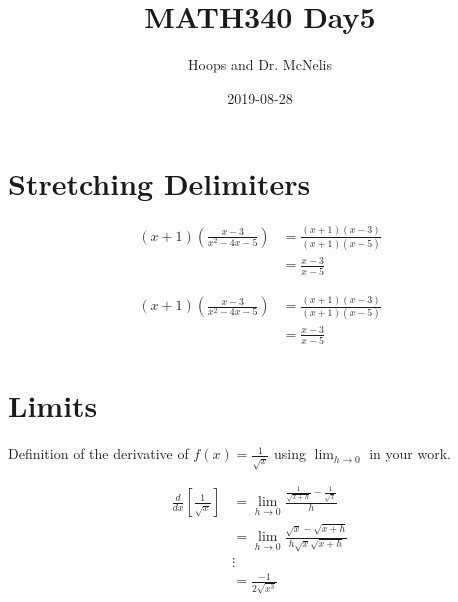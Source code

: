 \documentclass{article}
\title{MATH340 Day5}
\author{Hoops and Dr. McNelis}
\date{2019-08-28}
\begin{document}
\maketitle

\section{Stretching Delimiters}

\begin{align*} %
    (x+1) ( \frac{x-3}{x^2-4x-5} ) &= \frac{(x+1)(x-3)}{(x+1)(x-5)} \\
    &= \frac{x-3}{x-5}
\end{align*}

\begin{align*} %
    (x+1) \left( \frac{x-3}{x^2-4x-5} \right) &= \frac{(x+1)(x-3)}{(x+1)(x-5)} \\
    &= \frac{x-3}{x-5}
\end{align*}


\section{Limits}

Definition of the derivative of \( f(x) = \frac{1}{\sqrt{x}} \) using \(\displaystyle\lim_{h \to 0}\) in your work. %

\begin{align*}
    \frac{d}{dx} \left[ \frac{1}{\sqrt{x}} \right] &= \lim_{h \to 0} \frac{\frac{1}{\sqrt{x+h} } - \frac{1}{\sqrt{x}}}{h} \\
    &= \lim_{h \to 0} \frac{\sqrt{x}-\sqrt{x+h} }{h\sqrt{x}\sqrt{x+h}} \\
    &\vdots \\
    &= \frac{-1}{2\sqrt{x^3}}
\end{align*}
\end{document}
